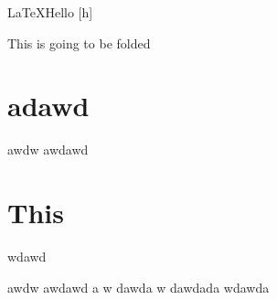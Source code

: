 \documentclass{article} %
\begin{document}
\LaTeX Hello [h]

This is going to be folded
\section{adawd}
awdw
awdawd
\section{This}
wdawd


awdw
awdawd
a
w
dawda
w
dawdada
wdawda
\end{document}
